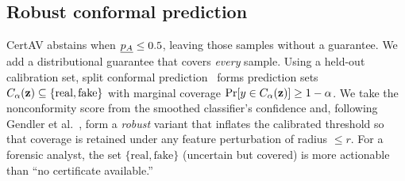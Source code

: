 \subsection{Robust conformal prediction}
\label{ssec:conformal}

CertAV abstains when $\underline{p_A}\le 0.5$, leaving those samples without a guarantee. We add a distributional guarantee that covers \emph{every} sample. Using a held-out calibration set, split conformal prediction~\cite{romano2020classification,angelopoulos2023conformal} forms prediction sets $C_\alpha({\mathbf z})\subseteq\{\text{real},\text{fake}\}$ with marginal coverage $\Pr[y\in C_\alpha({\mathbf z})]\ge 1-\alpha$. We take the nonconformity score from the smoothed classifier's confidence and, following Gendler et al.~\cite{gendler2022adversarially}, form a \emph{robust} variant that inflates the calibrated threshold so that coverage is retained under any feature perturbation of radius $\le r$. For a forensic analyst, the set $\{\text{real},\text{fake}\}$ (uncertain but covered) is more actionable than ``no certificate available.''
